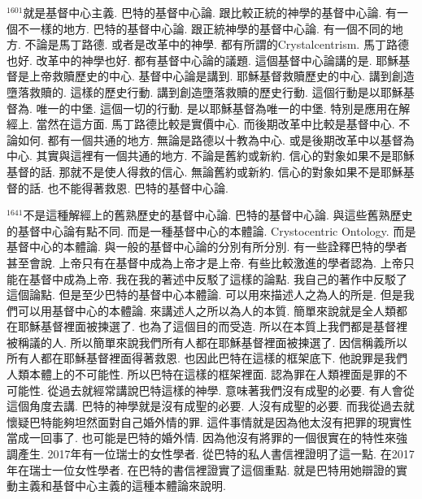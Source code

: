 \documentclass{book}
\begin{document}
$^{1601}$就是基督中心主義.
巴特的基督中心論.
跟比較正統的神學的基督中心論.
有一個不一樣的地方.
巴特的基督中心論.
跟正統神學的基督中心論.
有一個不同的地方.
不論是馬丁路德.
或者是改革中的神學.
都有所謂的Crystalcentrism.
馬丁路德也好.
改革中的神學也好.
都有基督中心論的議題.
這個基督中心論講的是.
耶穌基督是上帝救贖歷史的中心.
基督中心論是講到.
耶穌基督救贖歷史的中心.
講到創造墮落救贖的.
這樣的歷史行動.
講到創造墮落救贖的歷史行動.
這個行動是以耶穌基督為.
唯一的中堡.
這個一切的行動.
是以耶穌基督為唯一的中堡.
特別是應用在解經上.
當然在這方面.
馬丁路德比較是實價中心.
而後期改革中比較是基督中心.
不論如何.
都有一個共通的地方.
無論是路德以十教為中心.
或是後期改革中以基督為中心.
其實與這裡有一個共通的地方.
不論是舊約或新約.
信心的對象如果不是耶穌基督的話.
那就不是使人得救的信心.
無論舊約或新約.
信心的對象如果不是耶穌基督的話.
也不能得著救恩.
巴特的基督中心論.

$^{1641}$不是這種解經上的舊熟歷史的基督中心論.
巴特的基督中心論.
與這些舊熟歷史的基督中心論有點不同.
而是一種基督中心的本體論.
Crystocentric Ontology.
而是基督中心的本體論.
與一般的基督中心論的分別有所分別.
有一些詮釋巴特的學者甚至會說.
上帝只有在基督中成為上帝才是上帝.
有些比較激進的學者認為.
上帝只能在基督中成為上帝.
我在我的著述中反駁了這樣的論點.
我自己的著作中反駁了這個論點.
但是至少巴特的基督中心本體論.
可以用來描述人之為人的所是.
但是我們可以用基督中心的本體論.
來講述人之所以為人的本質.
簡單來說就是全人類都在耶穌基督裡面被揀選了.
也為了這個目的而受造.
所以在本質上我們都是基督裡被稱議的人.
所以簡單來說我們所有人都在耶穌基督裡面被揀選了.
因信稱義所以所有人都在耶穌基督裡面得著救恩.
也因此巴特在這樣的框架底下.
他說罪是我們人類本體上的不可能性.
所以巴特在這樣的框架裡面.
認為罪在人類裡面是罪的不可能性.
從過去就經常講說巴特這樣的神學.
意味著我們沒有成聖的必要.
有人會從這個角度去講.
巴特的神學就是沒有成聖的必要.
人沒有成聖的必要.
而我從過去就懷疑巴特能夠坦然面對自己婚外情的罪.
這件事情就是因為他太沒有把罪的現實性當成一回事了.
也可能是巴特的婚外情.
因為他沒有將罪的一個很實在的特性來強調產生.
2017年有一位瑞士的女性學者.
從巴特的私人書信裡證明了這一點.
在2017年在瑞士一位女性學者.
在巴特的書信裡證實了這個重點.
就是巴特用她辯證的實動主義和基督中心主義的這種本體論來說明.
\end{document}
